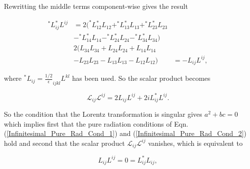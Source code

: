 \begin{appendix}
\noindent Rewritting the middle terms component-wise gives the result

\begin{align*}
^{*}L_{ij} ^{*}L^{ij} & = 2 ( ^{*}L_{12} ^{*}L_{12} + ^{*}L_{13} ^{*}L_{13} + ^{*}L_{23} ^{*}L_{23} \\
                     & - ^{*}L_{14} ^{*}L_{14} - ^{*}L_{24} ^{*}L_{24} - ^{*}L_{34} ^{*}L_{34}) \\
                     & 2( L_{34}L_{34} + L_{24}L_{24} + L_{14}L_{14} \\
                     & - L_{23}L_{23} - L_{13}L_{13} - L_{12}L_{12})
                     & = - L_{ij}L^{ij},
\end{align*}

\noindent where $^{*}L_{ij} = \frac{1/2}\epsilon_{ijkl}L^{kl}$ has been used. So the scalar product becomes

\begin{equation*}
\mathcal{L}_{ij} \mathcal{L}^{ij} = 2 L_{ij}L^{ij} + 2i L_{ij}^{*}L^{ij}.
\end{equation*}

\noindent So the condition that the Lorentz transformation is singular gives $a^2 + bc = 0$ which implies first that the pure radiation conditions of Eqn.(\ref{Infinitesimal_Pure_Rad_Cond_1}) and (\ref{Infinitesimal_Pure_Rad_Cond_2}) hold and second that the scalar product $\mathcal{L}_{ij} \mathcal{L}^{ij}$ vanishes, which is equivalent to 
   
\begin{equation*}
L_{ij}L^{ij} = 0 = L_{ij} ^{*}L_{ij},
\end{equation*}

\end{appendix}

